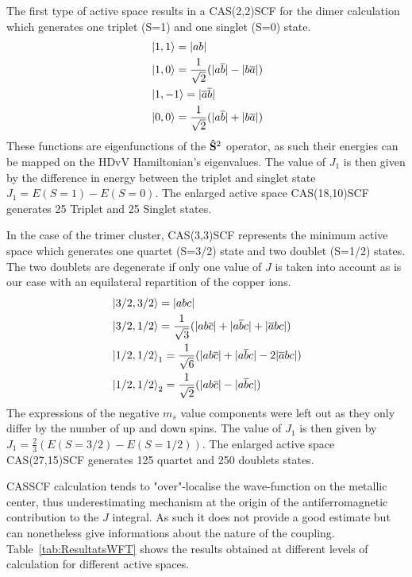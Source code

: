 \documentclass[12pt]{report}
\numberwithin{equation}{section}
\begin{document}
\noindent The first type of active space results in a CAS(2,2)SCF for the dimer calculation which generates one triplet (S=1) and one singlet (S=0) state.
\begin{align}
    &\ket{1,1}=|ab|\\
    &\ket{1,0}=\frac{1}{\sqrt{2}}(|a\overline{b}|-|b\overline{a}|)\\
    &\ket{1,-1}=|\overline{a}\overline{b}|\\
    &\ket{0,0}=\frac{1}{\sqrt{2}}(|a\overline{b}|+|b\overline{a}|)
\end{align}
These functions are eigenfunctions of the $\vb{\hat{S}}^2$ operator, as such their energies can be mapped on the HDvV Hamiltonian's eigenvalues.
The value of $J_1$ is then given by the difference in energy between the triplet and singlet state $J_1=E(S=1)-E(S=0)$.
The enlarged active space CAS(18,10)SCF generates 25 Triplet and 25 Singlet states.

In the case of the trimer cluster, CAS(3,3)SCF represents the minimum active space which generates one quartet (S=3/2) state and two doublet (S=1/2) states.
The two doublets are degenerate if only one value of $J$ is taken into account as is our case with an equilateral repartition of the copper ions.
\begin{align}
    &\ket{3/2,3/2}=|abc|\\
    &\ket{3/2,1/2}=\frac{1}{\sqrt{3}}(|ab\overline{c}|+|a\overline{b}c|+|\overline{a}bc|)\\
    &\ket{1/2,1/2}_1=\frac{1}{\sqrt{6}}(|ab\overline{c}|+|a\overline{b}c|-2|\overline{a}bc|)\\
    &\ket{1/2,1/2}_2=\frac{1}{\sqrt{2}}(|ab\overline{c}|-|a\overline{b}c|)
\end{align}
The expressions of the negative $m_s$ value components were left out as they only differ by the number of up and down spins.
The value of $J_1$ is then given by $J_1=\frac{2}{3}(E(S=3/2)-E(S=1/2))$.
The enlarged active space CAS(27,15)SCF generates 125 quartet and 250 doublets states.

CASSCF calculation tends to "over"-localise the wave-function on the metallic center, thus underestimating mechanism at the origin of the antiferromagnetic contribution to the $J$ integral.
As such it does not provide a good estimate but can nonetheless give informations about the nature of the coupling.
Table~\ref{tab:ResultatsWFT} shows the results obtained at different levels of calculation for different active spaces.
\end{document}
